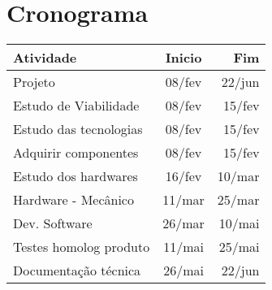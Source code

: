 \documentclass{acm_proc_article-sp}
\begin{document}
\section{Cronograma}


\begin{table}[h!]
\centering
\begin{tabular}{l|c|r}
Atividade & Inicio & Fim \\
\hline
Projeto & 08/fev & 22/jun \\
\hline
Estudo de Viabilidade & 08/fev & 15/fev \\
Estudo das tecnologias & 08/fev & 15/fev \\
Adquirir componentes & 08/fev & 15/fev \\
Estudo dos hardwares & 16/fev & 10/mar \\
Hardware - Mecânico & 11/mar & 25/mar \\
Dev. Software & 26/mar & 10/mai \\
Testes homolog produto & 11/mai & 25/mai \\
Documentação técnica & 26/mai & 22/jun \\
\end{tabular}
\label{tab:my_label}
\end{table}
\end{document}
